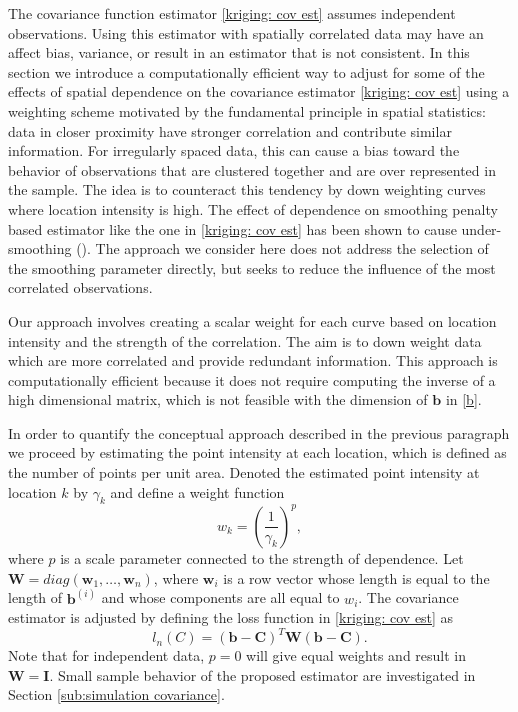 The covariance function estimator \eqref{kriging: cov est} assumes independent observations. Using this estimator with spatially correlated data may have an affect bias, variance, or result in an estimator that is not consistent. In this section we introduce a computationally efficient way to adjust for some of the effects of spatial dependence on the covariance estimator \ref{kriging: cov est} using a weighting scheme motivated by the fundamental principle in spatial statistics: data in closer proximity have stronger correlation and contribute similar information. For irregularly spaced data, this can cause a bias toward the behavior of observations that are clustered together and are over represented in the sample. The idea is to counteract this tendency by down weighting curves where location intensity is high. The effect of dependence on smoothing penalty based estimator like the one in \eqref{kriging: cov est} has been shown to cause under-smoothing (\cite{Wang:1998tq}). The approach we consider here does not address the selection of the smoothing parameter directly, but seeks to reduce the influence of the most correlated observations. 

Our approach involves creating a scalar weight for each curve based on location intensity and the strength of the correlation. The aim is to down weight data which are more correlated and provide redundant information. This approach is computationally efficient because it does not require computing the inverse of a high dimensional matrix, which is not feasible with the dimension of $\mathbf{b}$ in \eqref{b}.  

In order to quantify the conceptual approach described in the previous paragraph we proceed by estimating the point intensity at each location, which is defined as the number of points per unit area. Denoted the estimated point intensity at location $k$ by $\gamma_k$ and define a weight function 
\begin{equation}
	w_k = \left(\frac{1}{\gamma_k}\right)^p, 
\end{equation}
where $p$ is a scale parameter connected to the strength of dependence.
Let $\mathbf{W}=diag(\mathbf{w}_1, \dots, \mathbf{w}_n)$, where $\mathbf{w}_i$ is a row vector whose length is equal to the length of $\mathbf{b}^{(i)}$ and whose components are all equal to $w_i$. The covariance estimator is adjusted by defining the loss function in \eqref{kriging: cov est} as 
\begin{equation}
	l_{n}(C)= (\mathbf{b} - \mathbf{C})^T\mathbf{W}(\mathbf{b} - \mathbf{C}). \label{eq:diag weighted loss function} 
\end{equation}
Note that for independent data, $p = 0$ will give equal weights and result in $\mathbf{W} = \mathbf{I}$. Small sample behavior of the proposed estimator are investigated in Section \ref{sub:simulation covariance}. 


